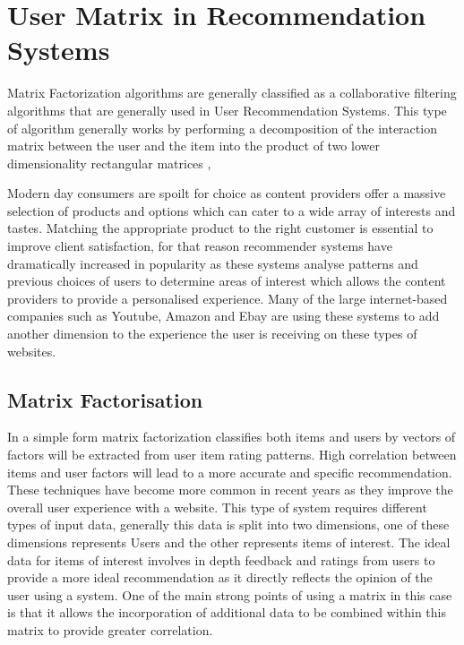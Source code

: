 \chapter{User Matrix in Recommendation Systems}\label{ch:user-matrix}


Matrix Factorization algorithms are generally classified as a collaborative filtering algorithms that are generally used in User Recommendation Systems. This type of algorithm generally works by performing a decomposition of the interaction matrix between the user and the item into the product of two lower dimensionality rectangular matrices \citep{Koren2006},

Modern day consumers are spoilt for choice as content providers offer a massive selection of products and options which can cater to a wide array of interests and tastes. Matching the appropriate product to the right customer is essential to improve client satisfaction, for that reason recommender systems have dramatically increased in popularity as these systems analyse patterns and previous choices of users to determine areas of interest which allows the content providers to provide a personalised experience. Many of the large internet-based companies such as Youtube, Amazon and Ebay are using these systems to add another dimension to the experience the user is receiving on these types of websites.
\section{Matrix Factorisation}
In a simple form matrix factorization classifies both items and users by vectors of factors will be extracted from user item rating patterns. High correlation between items and user factors will lead to a more accurate and specific recommendation. These techniques have become more common in recent years as they improve the overall user experience with a website. This type of system requires different types of input data, generally this data is split into two dimensions, one of these dimensions represents Users and the other represents items of interest. The ideal data for items of interest involves in depth feedback and ratings from users to provide a more ideal recommendation as it directly reflects the opinion of the user using a system. One of the main strong points of using a matrix in this case is that it allows the incorporation of additional data to be combined within this matrix to provide greater correlation. 

